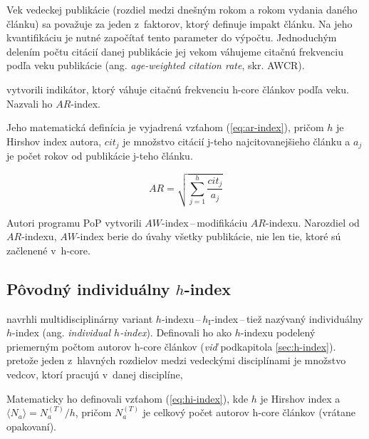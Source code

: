 Vek vedeckej publikácie (rozdiel medzi dnešným rokom a rokom vydania daného
článku) sa považuje za jeden z~faktorov, ktorý definuje impakt článku.  Na jeho
kvantifikáciu je nutné započítať tento parameter do výpočtu.  Jednoduchým
delením počtu citácií danej publikácie jej vekom váhujeme citačnú frekvenciu
podľa veku publikácie (ang. \emph{age-weighted citation rate}, skr. AWCR).

\citet{Jin2007} vytvorili indikátor, ktorý váhuje citačnú frekvenciu h-core
článkov podľa veku.  Nazvali ho $\mathit{AR}$-index.

Jeho matematická definícia je vyjadrená vzťahom (\ref{eq:ar-index}), pričom $h$ je
Hirshov index autora, $\mathit{cit}_j$ je množstvo citácií j-teho
najcitovanejšieho článku a $a_j$ je počet rokov od publikácie j-teho článku.

\begin{equation}
\label{eq:ar-index}
\mathit{AR} = \sqrt{\sum_{j=1}^h{\frac{\mathit{cit}_j}{a_j}}}
\end{equation}

Autori programu PoP
 vytvorili
$\mathit{AW}$-index\,--\,modifikáciu $\mathit{AR}$-indexu.  Narozdiel od
$\mathit{AR}$-indexu, $\mathit{AW}$-index berie do úvahy všetky publikácie, nie
len tie, ktoré sú začlenené v~h-core.


\subsection{Pôvodný individuálny $h$-index}
\label{sec:hi-index}

\citet{Batista2006} navrhli multidisciplinárny variant
$h$-indexu\,--\,$h_{\mathrm{I}}$-index\,--\,tiež nazývaný individuálny $h$-index (ang.
\emph{individual $h$-index}).  Definovali ho ako $h$-indexu podelený priemerným
počtom autorov h-core článkov (\emph{viď} podkapitola \ref{sec:h-index}).
pretože jeden z~hlavných rozdielov medzi vedeckými disciplínami je
množstvo vedcov, ktorí pracujú v~danej disciplíne,


Matematicky ho definovali vzťahom (\ref{eq:hi-index}), kde $h$ je Hirshov index a
$\langle N_a \rangle = N_a^{(T)} / h$, pričom $N_a^{(T)}$ je celkový počet
autorov h-core článkov (vrátane opakovaní).

